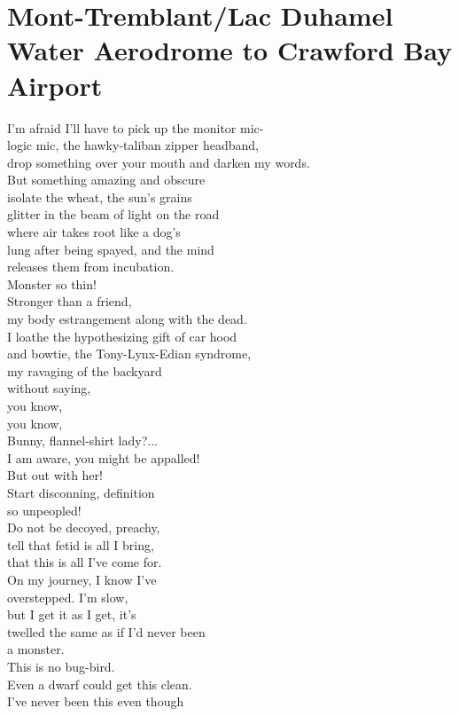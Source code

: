 \documentclass[smalldemyvopaper,11pt,twoside,onecolumn,openright,extrafontsizes]{memoir}
\newlength\drop
\begin{document}
\chapter{Mont-Tremblant/Lac Duhamel Water Aerodrome to Crawford Bay Airport}
I'm afraid I'll have to pick up the monitor mic-
\\logic mic, the hawky-taliban zipper headband,
\\drop something over your mouth and darken my words.
\\But something amazing and obscure
\\isolate the wheat, the sun's grains
\\glitter in the beam of light on the road
\\where air takes root like a dog's
\\lung after being spayed, and the mind
\\releases them from incubation.
\\Monster so thin!
\\Stronger than a friend,
\\my body estrangement along with the dead.
\\I loathe the hypothesizing gift of car hood
\\and bowtie, the Tony-Lynx-Edian syndrome,
\\my ravaging of the backyard
\\without saying,
\\you know,
\\you know,
\\Bunny, flannel-shirt lady?...
\\I am aware, you might be appalled!
\\But out with her!
\\Start discon­ning, definition
\\so unpeopled!
\\Do not be decoyed, preachy,
\\tell that fetid is all I bring,
\\that this is all I've come for.
\\On my journey, I know I've
\\overstepped. I'm slow,
\\but I get it as I get, it's
\\twelled the same as if I'd never been
\\a monster.
\\This is no bug-bird.
\\Even a dwarf could get this clean.
\\I've never been this even though
\end{document}
